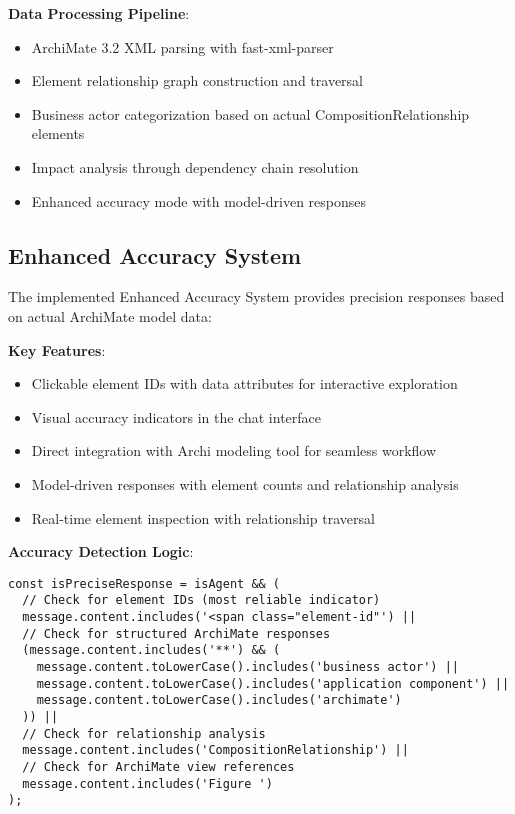\documentclass[12pt,a4paper]{article}
\begin{document}
\textbf{Data Processing Pipeline}:
\begin{itemize}
    \item ArchiMate 3.2 XML parsing with fast-xml-parser
    \item Element relationship graph construction and traversal
    \item Business actor categorization based on actual CompositionRelationship elements
    \item Impact analysis through dependency chain resolution
    \item Enhanced accuracy mode with model-driven responses
\end{itemize}

\subsection{Enhanced Accuracy System}

The implemented Enhanced Accuracy System provides precision responses based on actual ArchiMate model data:

\textbf{Key Features}:
\begin{itemize}
    \item Clickable element IDs with data attributes for interactive exploration
    \item Visual accuracy indicators in the chat interface
    \item Direct integration with Archi modeling tool for seamless workflow
    \item Model-driven responses with element counts and relationship analysis
    \item Real-time element inspection with relationship traversal
\end{itemize}

\textbf{Accuracy Detection Logic}:
\begin{lstlisting}[style=turtle, caption=Enhanced Accuracy Mode Detection]
const isPreciseResponse = isAgent && (
  // Check for element IDs (most reliable indicator)
  message.content.includes('<span class="element-id"') ||
  // Check for structured ArchiMate responses
  (message.content.includes('**') && (
    message.content.toLowerCase().includes('business actor') ||
    message.content.toLowerCase().includes('application component') ||
    message.content.toLowerCase().includes('archimate')
  )) ||
  // Check for relationship analysis
  message.content.includes('CompositionRelationship') ||
  // Check for ArchiMate view references
  message.content.includes('Figure ')
);
\end{lstlisting}
\end{document}
